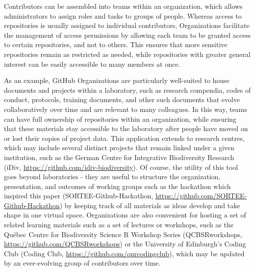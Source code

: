 Contributors can be assembled into teams within an organization, which allows administrators to assign roles and tasks to groups of people.
Whereas access to repositories is usually assigned to individual contributors, Organizations facilitate the management of access permissions by allowing each team to be granted access to certain repositories, and not to others.
This ensures that more sensitive repositories remain as restricted as needed, while repositories with greater general interest can be easily accessible to many members at once.

As an example, GitHub Organizations are particularly well-suited to house documents and projects within a laboratory, such as research compendia, codes of conduct, protocols, training documents, and other such documents that evolve collaboratively over time and are relevant to many colleagues.
In this way, teams can have full ownership of repositories within an organization, while ensuring that these materials stay accessible to the laboratory after people have moved on or lost their copies of project data.
This application extends to research centres, which may include several distinct projects that remain linked under a given institution, such as the German Centre for Integrative Biodiversity Research (iDiv, \url{https://github.com/idiv-biodiversity}).
Of course, the utility of this tool goes beyond laboratories - they are useful to structure the organization, presentation, and outcomes of working groups such as the hackathon which inspired this paper (SORTEE-Github-Hackathon, \url{https://github.com/SORTEE-Github-Hackathon}) by keeping track of all materials as ideas develop and take shape in one virtual space.
Organizations are also convenient for hosting a set of related learning materials such as a set of lectures or workshops, such as the Québec Centre for Biodiversity Science R Workshop Series (QCBSRworkshops, \url{https://github.com/QCBSRworkshops}) or the University of Edinburgh's Coding Club (Coding Club, \url{https://github.com/ourcodingclub}), which may be updated by an ever-evolving group of contributors over time.

